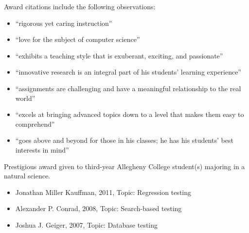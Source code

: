 \documentclass[11pt,letterpaper,sans]{moderncv}
\begin{document}
{Award citations include the following observations: \vspace*{.025in}
  \begin{itemize}
    \renewcommand\labelitemi{\Large\textbullet}
    \item ``rigorous yet caring instruction''
    \item ``love for the subject of computer science''
    \item ``exhibits a teaching style that is exuberant, exciting, and passionate''
    \item ``innovative research is an integral part of his students’ learning experience''
    \item ``assignments are challenging and have a meaningful relationship to the real world''
    \item ``excels at bringing advanced topics down to a level that makes them easy to comprehend''
    \item ``goes above and beyond for those in his classes; he has his students’ best interests in mind''
  \end{itemize}}


{Prestigious award given to third-year Allegheny College student(s) majoring in a natural science. \vspace*{.025in}
  \begin{itemize}
    \renewcommand\labelitemi{\Large\textbullet}
    \item Jonathan Miller Kauffman, 2011, Topic: Regression testing
    \item Alexander P. Conrad, 2008, Topic: Search-based testing
    \item Joshua J. Geiger, 2007, Topic: Database testing
  \end{itemize}\vspace*{.05in}}

\end{document}
